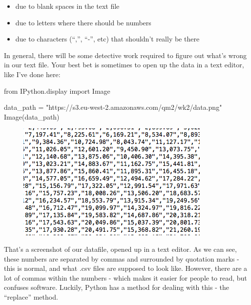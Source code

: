 \documentclass[
  letterpaper,
  DIV=11,
  numbers=noendperiod]{scrreprt}
\newenvironment{Shaded}{\begin{snugshade}}{\end{snugshade}}
\newcommand{\ImportTok}[1]{\textcolor[rgb]{0.00,0.46,0.62}{#1}}
\newcommand{\NormalTok}[1]{\textcolor[rgb]{0.00,0.23,0.31}{#1}}
\newcommand{\OperatorTok}[1]{\textcolor[rgb]{0.37,0.37,0.37}{#1}}
\newcommand{\StringTok}[1]{\textcolor[rgb]{0.13,0.47,0.30}{#1}}
\begin{document}
\begin{itemize}
\item
  due to blank spaces in the text file
\item
  due to letters where there should be numbers
\item
  due to characters (``,'', ``-'', etc) that shouldn't really be there
\end{itemize}

In general, there will be some detective work required to figure out
what's wrong in our text file. Your best bet is sometimes to open up the
data in a text editor, like I've done here:

\begin{Shaded}
\begin{Highlighting}[]
\ImportTok{from}\NormalTok{ IPython.display }\ImportTok{import}\NormalTok{ Image}

\NormalTok{data\_path }\OperatorTok{=} \StringTok{"https://s3.eu{-}west{-}2.amazonaws.com/qm2/wk2/data.png"}
\NormalTok{Image(data\_path)}
\end{Highlighting}
\end{Shaded}

\begin{figure}[H]

{\centering \includegraphics{notebooks/W02. Pandas_files/figure-pdf/cell-15-output-1.png}

}

\end{figure}

That's a screenshot of our datafile, opened up in a text editor. As we
can see, these numbers are separated by commas and surrounded by
quotation marks - this is normal, and what .csv files are supposed to
look like. However, there are a lot of commas within the numbers - which
makes it easier for people to read, but confuses software. Luckily,
Python has a method for dealing with this - the ``replace'' method.
\end{document}
